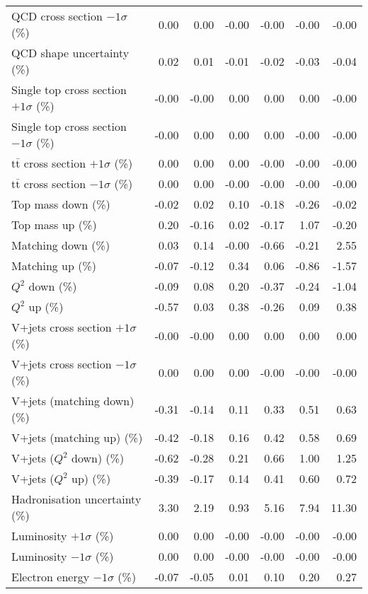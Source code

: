 \begin{table}[htbp]
{\begin{tabular}{lrrrrrr}
QCD cross section \ensuremath{-1\sigma} (\%) & 0.00 & 0.00 & -0.00 & -0.00 & -0.00 & -0.00 \\ 
QCD shape uncertainty (\%) & 0.02 & 0.01 & -0.01 & -0.02 & -0.03 & -0.04 \\ 
Single top cross section $+1\sigma$ (\%) & -0.00 & -0.00 & 0.00 & 0.00 & 0.00 & -0.00 \\ 
Single top cross section $-1\sigma$ (\%) & -0.00 & 0.00 & 0.00 & 0.00 & -0.00 & -0.00 \\ 
$\mathrm{t}\bar{\mathrm{t}}$ cross section $+1\sigma$ (\%) & 0.00 & 0.00 & 0.00 & -0.00 & -0.00 & -0.00 \\ 
$\mathrm{t}\bar{\mathrm{t}}$ cross section $-1\sigma$ (\%) & 0.00 & 0.00 & -0.00 & -0.00 & -0.00 & -0.00 \\ 
Top mass down (\%) & -0.02 & 0.02 & 0.10 & -0.18 & -0.26 & -0.02 \\ 
Top mass up (\%) & 0.20 & -0.16 & 0.02 & -0.17 & 1.07 & -0.20 \\ 
Matching down (\%) & 0.03 & 0.14 & -0.00 & -0.66 & -0.21 & 2.55 \\ 
Matching up (\%) & -0.07 & -0.12 & 0.34 & 0.06 & -0.86 & -1.57 \\ 
$Q^{2}$ down (\%) & -0.09 & 0.08 & 0.20 & -0.37 & -0.24 & -1.04 \\ 
$Q^{2}$ up (\%) & -0.57 & 0.03 & 0.38 & -0.26 & 0.09 & 0.38 \\ 
V+jets cross section \ensuremath{+1\sigma} (\%) & -0.00 & -0.00 & 0.00 & 0.00 & 0.00 & 0.00 \\ 
V+jets cross section \ensuremath{-1\sigma} (\%) & 0.00 & 0.00 & 0.00 & -0.00 & -0.00 & -0.00 \\ 
V+jets (matching down) (\%) & -0.31 & -0.14 & 0.11 & 0.33 & 0.51 & 0.63 \\ 
V+jets (matching up) (\%) & -0.42 & -0.18 & 0.16 & 0.42 & 0.58 & 0.69 \\ 
V+jets ($Q^{2}$ down) (\%) & -0.62 & -0.28 & 0.21 & 0.66 & 1.00 & 1.25 \\ 
V+jets ($Q^{2}$ up) (\%) & -0.39 & -0.17 & 0.14 & 0.41 & 0.60 & 0.72 \\ 
Hadronisation uncertainty (\%) & 3.30 & 2.19 & 0.93 & 5.16 & 7.94 & 11.30 \\ 
Luminosity $+1\sigma$ (\%) & 0.00 & 0.00 & -0.00 & -0.00 & -0.00 & -0.00 \\ 
Luminosity $-1\sigma$ (\%) & 0.00 & 0.00 & -0.00 & -0.00 & -0.00 & -0.00 \\ 
Electron energy $-1\sigma$ (\%) & -0.07 & -0.05 & 0.01 & 0.10 & 0.20 & 0.27 \\ 

\end{tabular}}
\end{table}
